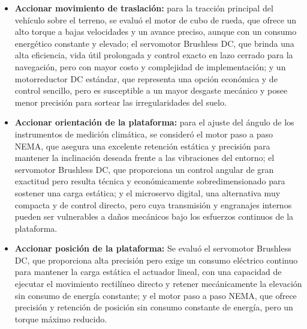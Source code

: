 \documentclass[../../General.tex]{subfiles}
\begin{document}
\begin{itemize}
	\item \textbf{Accionar movimiento de traslación:} para la tracción principal del vehículo sobre el terreno, se evaluó el motor de cubo de rueda, que ofrece un alto torque a bajas velocidades y un avance preciso, aunque con un consumo energético constante y elevado; el servomotor Brushless DC, que brinda una alta eficiencia, vida útil prolongada y control exacto en lazo cerrado para la navegación, pero con mayor costo y complejidad de implementación; y un motorreductor DC estándar, que representa una opción económica y de control sencillo, pero es susceptible a un mayor desgaste mecánico y posee menor precisión para sortear las irregularidades del suelo.
	
	\item \textbf{Accionar orientación de la plataforma:} para el ajuste del ángulo de los instrumentos de medición climática, se consideró el motor paso a paso NEMA, que asegura una excelente retención estática y precisión para mantener la inclinación deseada frente a las vibraciones del entorno; el servomotor Brushless DC, que proporciona un control angular de gran exactitud pero resulta técnica y económicamente sobredimensionado para sostener una carga estática; y el microservo digital, una alternativa muy compacta y de control directo, pero cuya transmisión y engranajes internos pueden ser vulnerables a daños mecánicos bajo los esfuerzos continuos de la plataforma.
	
	\item \textbf{Accionar posición de la plataforma:} Se evaluó el servomotor Brushless DC, que proporciona alta precisión pero exige un consumo eléctrico continuo para mantener la carga estática el actuador lineal, con una capacidad de ejecutar el movimiento rectilíneo directo y retener mecánicamente la elevación sin consumo de energía constante; y el motor paso a paso NEMA, que ofrece precisión y retención de posición sin consumo constante de energía, pero un torque máximo reducido.

\end{itemize}
\end{document}
